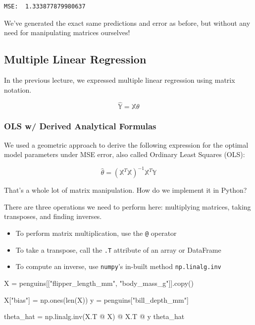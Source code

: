 \documentclass[
  letterpaper,
  DIV=11,
  numbers=noendperiod]{scrreprt}
\newenvironment{Shaded}{\begin{snugshade}}{\end{snugshade}}
\newcommand{\BuiltInTok}[1]{\textcolor[rgb]{0.00,0.23,0.31}{#1}}
\newcommand{\NormalTok}[1]{\textcolor[rgb]{0.00,0.23,0.31}{#1}}
\newcommand{\OperatorTok}[1]{\textcolor[rgb]{0.37,0.37,0.37}{#1}}
\newcommand{\StringTok}[1]{\textcolor[rgb]{0.13,0.47,0.30}{#1}}
\providecommand{\tightlist}{%
  \setlength{\itemsep}{0pt}\setlength{\parskip}{0pt}}\usepackage{longtable,booktabs,array}
\begin{document}
\begin{verbatim}
MSE:  1.333877879980637
\end{verbatim}

We've generated the exact same predictions and error as before, but
without any need for manipulating matrices ourselves!

\hypertarget{multiple-linear-regression-1}{%
\subsection{Multiple Linear
Regression}\label{multiple-linear-regression-1}}

In the previous lecture, we expressed multiple linear regression using
matrix notation.

\[\hat{\mathbb{Y}} = \mathbb{X}\theta\]

\hypertarget{ols-w-derived-analytical-formulas}{%
\subsubsection{OLS w/ Derived Analytical
Formulas}\label{ols-w-derived-analytical-formulas}}

We used a geometric approach to derive the following expression for the
optimal model parameters under MSE error, also called Ordinary Least
Squares (OLS):

\[\hat{\theta} = (\mathbb{X}^T \mathbb{X})^{-1}\mathbb{X}^T \mathbb{Y}\]

That's a whole lot of matrix manipulation. How do we implement it in
Python?

There are three operations we need to perform here: multiplying
matrices, taking transposes, and finding inverses.

\begin{itemize}
\tightlist
\item
  To perform matrix multiplication, use the \texttt{@} operator
\item
  To take a transpose, call the \texttt{.T} attribute of an array or
  DataFrame
\item
  To compute an inverse, use \texttt{numpy}'s in-built method
  \texttt{np.linalg.inv}
\end{itemize}

\begin{Shaded}
\begin{Highlighting}[]
\NormalTok{X }\OperatorTok{=}\NormalTok{ penguins[[}\StringTok{"flipper\_length\_mm"}\NormalTok{, }\StringTok{"body\_mass\_g"}\NormalTok{]].copy()}

\NormalTok{X[}\StringTok{"bias"}\NormalTok{] }\OperatorTok{=}\NormalTok{ np.ones(}\BuiltInTok{len}\NormalTok{(X))}
\NormalTok{y }\OperatorTok{=}\NormalTok{ penguins[}\StringTok{"bill\_depth\_mm"}\NormalTok{]}


\NormalTok{theta\_hat }\OperatorTok{=}\NormalTok{ np.linalg.inv(X.T }\OperatorTok{@}\NormalTok{ X) }\OperatorTok{@}\NormalTok{ X.T }\OperatorTok{@}\NormalTok{ y}
\NormalTok{theta\_hat  }
\end{Highlighting}
\end{Shaded}
\end{document}
